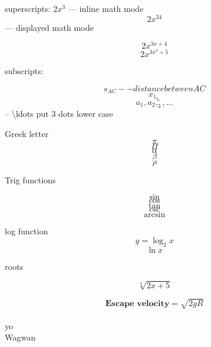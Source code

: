 \documentclass[12pt]{article}
\begin{document}
superscripts: $2x^3$ --- inline math mode
$$2x^{34}$$ --- displayed math mode

$$2x^{3x+4}$$
$$2x^{3x^{4}+5}$$

subscripts:

$$s_{AC} -- distance between AC$$
$$x_{1_{2_{3}}}$$ 
$$a_1,a_2,_3,\ldots$$ -- \textbackslash ldots put 3 dots lower case

Greek letter
$$\pi$$
$$\Pi$$
$$\alpha$$
$$\beta$$
$$\rho$$

Trig functions

$$\sin$$
$$\cos$$
$$\tan$$
$$\csc$$
$$\arcsin$$

log function
$$ y = \log_2 x$$
$$\ln x$$

roots

$$ \sqrt[4]{2x+5} $$

$$ \textbf{Escape velocity} = \sqrt{2gR} $$
\\
yo
\\[14pt]
Wagwan
\end{document}
